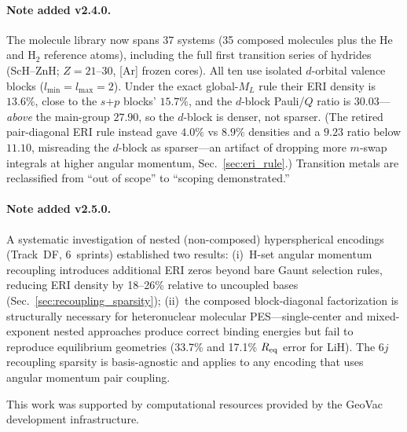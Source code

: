 \documentclass[aps,pra,twocolumn,superscriptaddress,longbibliography]{revtex4-2}
\begin{document}
\paragraph{Note added v2.4.0.}
The molecule library now spans 37 systems (35 composed molecules plus
the He and H$_2$ reference atoms), including
the full first transition series of hydrides (ScH--ZnH; $Z = 21$--30,
[Ar] frozen cores).  All ten use isolated $d$-orbital
valence blocks ($l_{\min} = l_{\max} = 2$).  Under the exact
global-$M_L$ rule their ERI density is $13.6\%$, close to the $s$+$p$
blocks' $15.7\%$, and the $d$-block Pauli/$Q$ ratio is $30.03$---\emph{above}
the main-group $27.90$, so the $d$-block is denser, not sparser.  (The
retired pair-diagonal ERI rule instead gave $4.0\%$ vs $8.9\%$ densities
and a $9.23$ ratio below $11.10$, misreading the $d$-block as sparser---an
artifact of dropping more $m$-swap integrals at higher angular momentum,
Sec.~\ref{sec:eri_rule}.)
Transition metals
are reclassified from ``out of scope'' to ``scoping demonstrated.''

\paragraph{Note added v2.5.0.}
A systematic investigation of nested (non-composed) hyperspherical
encodings (Track~DF, 6~sprints) established two results:
(i)~H-set angular momentum recoupling introduces additional ERI zeros
beyond bare Gaunt selection rules, reducing ERI density by 18--26\%
relative to uncoupled bases (Sec.~\ref{sec:recoupling_sparsity});
(ii)~the composed block-diagonal factorization is structurally necessary
for heteronuclear molecular PES---single-center and mixed-exponent
nested approaches produce correct binding energies but fail to reproduce
equilibrium geometries (33.7\% and 17.1\% $R_{\rm eq}$ error for LiH).
The 6$j$ recoupling sparsity is basis-agnostic and applies to any
encoding that uses angular momentum pair coupling.

\begin{acknowledgments}
This work was supported by computational resources provided by the GeoVac
development infrastructure.
\end{acknowledgments}
\end{document}
